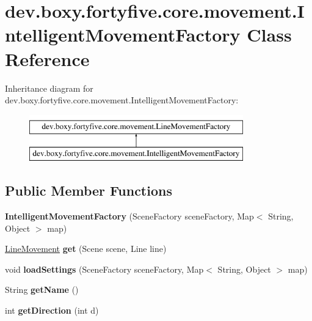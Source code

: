 \hypertarget{classdev_1_1boxy_1_1fortyfive_1_1core_1_1movement_1_1_intelligent_movement_factory}{
\section{dev.boxy.fortyfive.core.movement.IntelligentMovementFactory Class Reference}
\label{d0/d8b/classdev_1_1boxy_1_1fortyfive_1_1core_1_1movement_1_1_intelligent_movement_factory}
}
Inheritance diagram for dev.boxy.fortyfive.core.movement.IntelligentMovementFactory:\begin{figure}[H]
\begin{center}
\leavevmode
\includegraphics[height=2.000000cm]{d0/d8b/classdev_1_1boxy_1_1fortyfive_1_1core_1_1movement_1_1_intelligent_movement_factory}
\end{center}
\end{figure}
\subsection*{Public Member Functions}
\begin{DoxyCompactItemize}
\item 
\hypertarget{group___intelligent_movement_ga139ab6b9d2619f94f2ff08632d21e05e}{
{\bfseries IntelligentMovementFactory} (SceneFactory sceneFactory, Map$<$ String, Object $>$ map)}
\label{db/d13/group___intelligent_movement_ga139ab6b9d2619f94f2ff08632d21e05e}

\item 
\hypertarget{group___intelligent_movement_ga95299f8b15662239d8906eacdb24a660}{
\hyperlink{classdev_1_1boxy_1_1fortyfive_1_1core_1_1movement_1_1_line_movement}{LineMovement} {\bfseries get} (Scene scene, Line line)}
\label{db/d13/group___intelligent_movement_ga95299f8b15662239d8906eacdb24a660}

\item 
\hypertarget{group___intelligent_movement_ga289835fb28bb2eb8cd0a2525eab0e25e}{
void {\bfseries loadSettings} (SceneFactory sceneFactory, Map$<$ String, Object $>$ map)}
\label{db/d13/group___intelligent_movement_ga289835fb28bb2eb8cd0a2525eab0e25e}

\item 
\hypertarget{group___intelligent_movement_ga8d7c7e2d9d0afe11ce2690b02bc3edb4}{
String {\bfseries getName} ()}
\label{db/d13/group___intelligent_movement_ga8d7c7e2d9d0afe11ce2690b02bc3edb4}

\item 
\hypertarget{group___intelligent_movement_gac4dd4e21b27029044fcb5bfccb9241cd}{
int {\bfseries getDirection} (int d)}
\label{db/d13/group___intelligent_movement_gac4dd4e21b27029044fcb5bfccb9241cd}

\end{DoxyCompactItemize}
